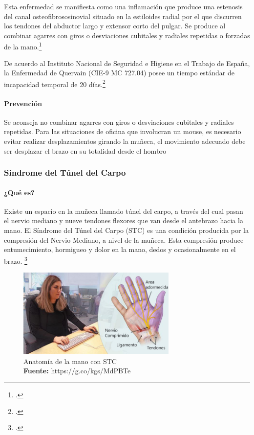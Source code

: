 Esta enfermedad se manifiesta como una inflamación que produce una estenosis del canal osteofibrososinovial situado en la estiloides radial por el que discurren los tendones del abductor largo y extensor corto del pulgar. Se produce al combinar agarres con giros o desviaciones cubitales y radiales repetidas o forzadas de la mano.\footcite[2]{TenosinovitisDelPulgarDDCENFERMEDADESTME}

De acuerdo al Instituto Nacional de Seguridad e Higiene en el Trabajo de España, la Enfermedad de Quervain (CIE-9 MC 727.04) posee un tiempo estándar de incapacidad temporal de 20 días.\footcite[6]{TenosinovitisDelPulgarDDCENFERMEDADESTME}
\paragraph{Prevención}
Se aconseja no combinar agarres con giros o desviaciones cubitales y radiales repetidas. Para las situaciones de oficina que involucran un mouse, es necesario evitar realizar desplazamientos girando la muñeca, el movimiento adecuado debe ser desplazar el brazo en su totalidad desde el hombro
\subsubsection{Sindrome del Túnel del Carpo}
\paragraph{¿Qué es?}
Existe un espacio en la muñeca llamado túnel del carpo, a través del cual pasan el nervio mediano y nueve tendones flexores que van desde el antebrazo hacia la mano. El Síndrome del Túnel del Carpo (STC) es una condición producida por la compresión del Nervio Mediano, a nivel de la muñeca. Esta compresión produce entumecimiento, hormigueo y dolor en la mano, dedos y ocasionalmente en el brazo. \footcite{SindromeCarpiano}

\begin{figure}[H]
    \centering
    \includegraphics[width=0.7\textwidth]{Anexos/LATEX/chapters/images/STC.jpg}
    \caption{Anatomía de la mano con STC \\\textbf{Fuente:} https://g.co/kgs/MdPBTe}
    \label{STC}
\end{figure}

